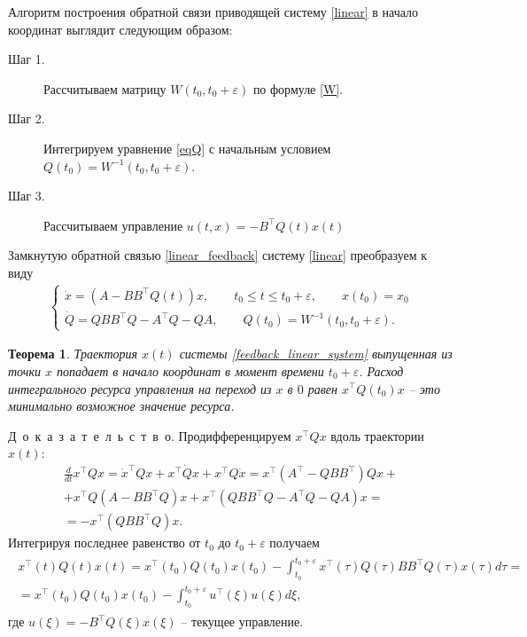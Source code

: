 \documentclass[12pt,a4paper,twoside]{article}  %
\newtheorem{teo}{Теорема}
\newcommand{\doc}{\mbox{Д о к а з а т е л ь с т в о}}
\begin{document}
Алгоритм построения обратной связи приводящей систему \eqref{linear} в начало координат выглядит следующим образом:
\begin{description}
	\item[Шаг 1.] Рассчитываем матрицу $ W(t_0,t_0+\varepsilon) $ по формуле \eqref{W}.
	\item[Шаг 2.] Интегрируем уравнение \eqref{eqQ} с начальным условием $ Q(t_0)  = W^{-1}(t_0,t_0+\varepsilon)$.
	\item[Шаг 3.] Рассчитываем управление $ u(t,x) = -B^{\top} Q(t) x(t)$
\end{description}
Замкнутую обратной связью \eqref{linear_feedback} систему \eqref{linear} преобразуем к виду
\begin{gather}\label{feedback_linear_system}
	\left\lbrace \begin{array}{l}
			\dot{x} = (A - B B^{\top} Q(t) ) x, \qquad t_0 \leqslant t \leqslant t_0 + \varepsilon, \qquad x(t_0) = x_0\\
			\dot{Q} = Q B B^{\top} Q - A^{\top}Q - Q A, \qquad Q(t_0) = W^{-1}(t_0,t_0+\varepsilon).
		\end{array} \right. 
	\end{gather}
\begin{teo}\label{linear_teo}
	Траектория $x(t) $ системы \eqref{feedback_linear_system} выпущенная из точки $ x $ попадает в начало координат в момент времени $ t_0 + \varepsilon$. Расход интегрального ресурса управления на переход из $ x $ в $ 0 $ равен $x^{\top} Q(t_0) x $ -- это минимально возможное значение ресурса.
\end{teo}
\doc. 
	Продифференцируем $x^{\top} Q x$ вдоль траектории $ x(t) $:
	\begin{gather*}
		\frac{d}{dt} x^{\top} Q x = \dot{x}^{\top} Q x + x^{\top} \dot{Q} x + x^{\top} Q \dot{x} = x^{\top} (A^{\top} - Q B B^{\top} )Q x + \\ + x^{\top} Q (A - B B^{\top} Q)x + x^{\top} (Q B B^{\top} Q - A^{\top}Q - Q A) x = \\ = 
		-x^{\top} (Q B B^{\top} Q) x.
	\end{gather*}
	Интегрируя последнее равенство от $ t_0 $ до $ t_0 + \varepsilon $ получаем
	\begin{gather}\label{xqx}
		\begin{gathered}
			x^{\top}(t) Q(t)x(t) = x^{\top}(t_0) Q(t_0)x(t_0) - \int_{t_0}^{t_0 + \varepsilon} x^{\top}(\tau) Q(\tau) B B^{\top} Q(\tau) x(\tau) d\tau= \\ = 
			x^{\top}(t_0) Q(t_0)x(t_0) - \int_{t_0}^{t_0 + \varepsilon} u^{\top}(\xi)  u(\xi) d\xi,
		\end{gathered}
	\end{gather}
где $ u(\xi) = -B^{\top} Q(\xi) x(\xi)$ -- текущее управление.
\end{document}
